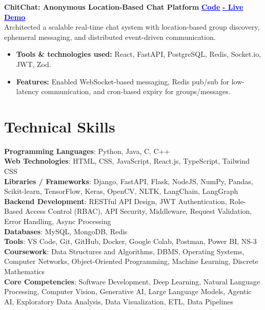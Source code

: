 \documentclass[letterpaper,10pt]{article}  %
\newcommand{\mysection}[1]{
\vspace{-7pt}
\section{#1}
}
\begin{document}
\vspace{-3pt}
\textbf{ChitChat: Anonymous Location-Based Chat Platform}
\href{https://github.com/Yash0030/PROJECT-C2.git}{\textbar{} \textcolor{blue}{\underline{\textbf{Code}}}}
\href{https://project-chitchat.vercel.app/}{\textcolor{blue}{\underline{\textbf{- Live Demo}}}}\\
\vspace{1pt}
Architected a scalable real-time chat system with location-based group discovery, ephemeral messaging, and distributed event-driven communication.\\
\vspace{-5pt}
\begin{itemize}
\item \textbf{Tools \& technologies used:} React, FastAPI, PostgreSQL, Redis, Socket.io, JWT, Zod.
\vspace{-2pt}
\item \textbf{Features:} Enabled WebSocket-based messaging, Redis pub/sub for low-latency communication, and cron-based expiry for groups/messages.
\end{itemize}



\mysection{Technical Skills}
\textbf{Programming Languages}: Python, Java, C, C++ \\
\vspace{2pt}
\textbf{Web Technologies}: HTML, CSS, JavaScript, React.js, TypeScript, Tailwind CSS \\
\vspace{2pt}
\textbf{Libraries / Frameworks}: Django, FastAPI, Flask, NodeJS, NumPy, Pandas, Scikit-learn, TensorFlow, Keras, OpenCV, NLTK, LangChain, LangGraph \\
\vspace{2pt}
\textbf{Backend Development}: RESTful API Design, JWT Authentication, Role-Based Access Control (RBAC), API Security, Middleware, Request Validation, Error Handling, Async Processing \\
\vspace{2pt}
\textbf{Databases}: MySQL, MongoDB, Redis \\
\vspace{2pt}
\textbf{Tools}: VS Code, Git, GitHub, Docker, Google Colab, Postman, Power BI, NS-3 \\
\vspace{2pt}
\textbf{Coursework}: Data Structures and Algorithms, DBMS, Operating Systems, Computer Networks, Object-Oriented Programming, Machine Learning, Discrete Mathematics \\
\vspace{2pt}
\textbf{Core Competencies}: Software Development, Deep Learning, Natural Language Processing, Computer Vision, Generative AI, Large Language Models, Agentic AI, Exploratory Data Analysis, Data Visualization, ETL, Data Pipelines
\end{document}
